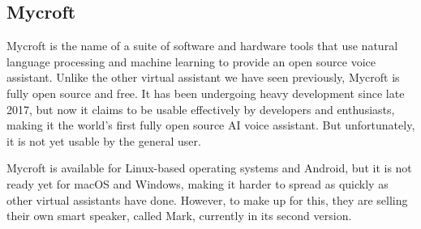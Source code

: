 \subsection{Mycroft}
Mycroft is the name of a suite of software and hardware tools that use natural language processing and machine learning to provide
an open source voice assistant.\cite{mycroftDocumentation} Unlike the other virtual assistant we have seen previously, Mycroft is
fully open source and free. It has been undergoing heavy development since late 2017, but now it claims to be usable effectively 
by developers and enthusiasts, making it the world's first fully open source AI voice assistant. But unfortunately, it is not yet usable
by the general user.

Mycroft is available for Linux-based operating systems and Android, but it is not ready yet for macOS and Windows, making it harder 
to spread as quickly as other virtual assistants have done. However, to make up for this, they are selling their own smart speaker, 
called Mark, currently in its second version.





